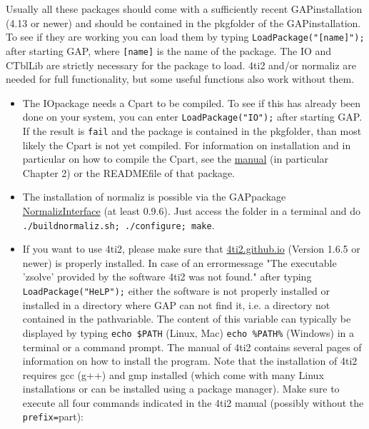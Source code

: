 \documentclass[a4paper,11pt]{report}
\begin{document}
{{\begin{itemize}
\begin{itemize}
 
\end{itemize}
 
\end{itemize}
 

 Usually all these packages should come with a sufficiently recent
GAP\texttt{}installation (4.13 or newer) and should be contained in
the pkg\texttt{}folder of the GAP\texttt{}installation.
To see if they are working you can load them by typing \texttt{LoadPackage("[name]");} after starting GAP, where \texttt{[name]} is the name of the package. The IO and CTblLib are strictly necessary for the
package to load. 4ti2 and/or normaliz are needed for full functionality, but
some useful functions also work without them. 
\begin{itemize}
\item  The IO\texttt{}package needs a C\texttt{}part to be
compiled. To see if this has already been done on your system, you can enter \texttt{LoadPackage("IO");} after starting GAP. If the result is \texttt{fail} and the package is contained in the pkg\texttt{}folder, than most
likely the C\texttt{}part is not yet compiled. For information on
installation and in particular on how to compile the
C\texttt{}part, see the \href{https://gap-packages.github.io/io/doc/chap0.html} {manual} (in particular Chapter 2) or the README\texttt{}file of that
package.

 
\item  The installation of normaliz is possible via the
GAP\texttt{}package \href{https://gap-packages.github.io/NormalizInterface//} {NormalizInterface} (at least 0.9.6). Just access the folder in a terminal and do \texttt{./build\texttt{}normaliz.sh; ./configure; make}. 
\item  If you want to use 4ti2, please make sure that \href{https://4ti2.github.io} {4ti2.github.io} (Version 1.6.5 or newer) is properly installed. In case of an
error\texttt{}message "The executable 'zsolve' provided by the
software 4ti2 was not found." after typing \texttt{LoadPackage("HeLP");} either the software is not properly installed or installed in a directory
where GAP can not find it, i.e. a directory not contained in the
path\texttt{}variable. The content of this variable can typically
be displayed by typing \texttt{echo \$PATH} (Linux, Mac) \texttt{echo \%PATH\%} (Windows) in a terminal or a command prompt. The manual of 4ti2 contains
several pages of information on how to install the program. Note that the
installation of 4ti2 requires gcc (g++) and gmp installed (which come with
many Linux installations or can be installed using a package manager). Make
sure to execute all four commands indicated in the 4ti2 manual (possibly
without the \texttt{\texttt{}\texttt{}prefix=}\texttt{}part):


\end{itemize}}}
\end{document}
